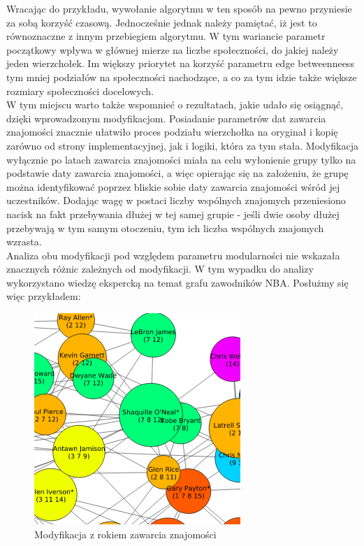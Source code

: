 \documentclass{article}
\begin{document}
Wracając do przykładu, wywołanie algorytmu w ten sposób na pewno przyniesie za sobą korzyść czasową. Jednocześnie jednak należy pamiętać, iż jest to równoznaczne z innym przebiegiem algorytmu. W tym wariancie parametr początkowy wpływa w głównej mierze na liczbe społeczności, do jakiej należy jeden wierzchołek. Im większy priorytet na korzyść parametru edge betweenneess tym mniej podziałów na społeczności nachodzące, a co za tym idzie także większe rozmiary społeczności docelowych.\\

W tym miejscu warto także wspomnieć o rezultatach, jakie udało się osiągnąć, dzięki wprowadzonym modyfikacjom. Posiadanie parametrów dat zawarcia znajomości znacznie ułatwiło proces podziału wierzchołka na oryginał i kopię zarówno od strony implementacyjnej, jak i logiki, która za tym stała. Modyfikacja wyłącznie po latach zawarcia znajomości miała na celu wyłonienie grupy tylko na podstawie daty zawarcia znajomości, a więc opierając się na założeniu, że grupę można identyfikować poprzez bliskie sobie daty zawarcia znajomości wśród jej uczestników. Dodając wagę w postaci liczby wspólnych znajomych przeniesiono nacisk na fakt przebywania dłużej w tej samej grupie - jeśli dwie osoby dłużej przebywają w tym samym otoczeniu, tym ich liczba wspólnych znajomych wzrasta.\\

Analiza obu modyfikacji pod względem parametru modularności nie wskazała znacznych różnic zależnych od modyfikacji. W tym wypadku do analizy wykorzystano wiedzę ekspercką na temat grafu zawodników NBA. Posłużmy się więc przykładem:

\begin{figure}[H]
\centering
\includegraphics[width=\textwidth]{images/is-sample-6.png}
\caption{Modyfikacja z rokiem zawarcia znajomości}
\end{figure}
\end{document}

